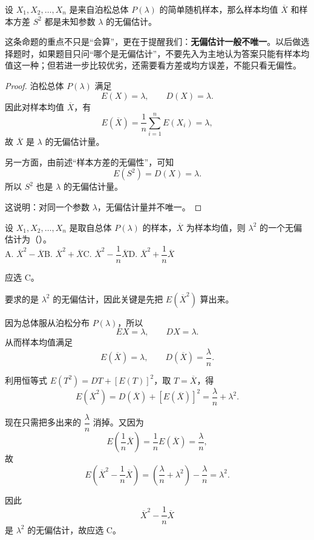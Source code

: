 ﻿\documentclass[lang=cn,11pt]{elegantbook}
\begin{document}
\begin{proposition}[泊松分布无偏估计的不唯一性]\label{prop:poisson-unbiased}
    设 $X_1, X_2, \dots, X_n$ 是来自泊松总体 $P(\lambda)$ 的简单随机样本，那么样本均值 $\overline{X}$ 和样本方差 $S^2$ 都是未知参数 $\lambda$ 的无偏估计。
\end{proposition}
\begin{note}
这条命题的重点不只是“会算”，更在于提醒我们：\textbf{无偏估计一般不唯一}。以后做选择题时，如果题目只问“哪个是无偏估计”，不要先入为主地认为答案只能有样本均值这一种；但若进一步比较优劣，还需要看方差或均方误差，不能只看无偏性。
\end{note}
\begin{proof}
泊松总体 \(P(\lambda)\) 满足
\[
E(X)=\lambda,\qquad D(X)=\lambda.
\]
因此对样本均值 \(\overline{X}\)，有
\[
E(\overline{X})=\frac{1}{n}\sum_{i=1}^n E(X_i)=\lambda,
\]
故 \(\overline{X}\) 是 \(\lambda\) 的无偏估计量。

另一方面，由前述“样本方差的无偏性”，可知
\[
E(S^2)=D(X)=\lambda.
\]
所以 \(S^2\) 也是 \(\lambda\) 的无偏估计量。

这说明：对同一个参数 \(\lambda\)，无偏估计量并不唯一。
\end{proof}

\begin{exercise}
    设 $X_1,X_2,\dots,X_n$ 是取自总体 $P(\lambda)$ 的样本，$\overline{X}$ 为样本均值，则 $\lambda^2$ 的一个无偏估计为（\quad）。\\
A. $\overline{X}^2 - \overline{X}$\qquad B. $\overline{X}^2 + \overline{X}$\qquad C. $\overline{X}^2 - \dfrac{1}{n}\overline{X}$\qquad D. $\overline{X}^2 + \dfrac{1}{n}\overline{X}$
\end{exercise}
\begin{solution}
应选 C。

要求的是 \(\lambda^2\) 的无偏估计，因此关键是先把 \(E(\overline{X}^2)\) 算出来。

因为总体服从泊松分布 \(P(\lambda)\)，所以
\[
EX=\lambda,\qquad DX=\lambda.
\]
从而样本均值满足
\[
E(\overline{X})=\lambda,\qquad D(\overline{X})=\frac{\lambda}{n}.
\]

利用恒等式 \(E(T^2)=DT+[E(T)]^2\)，取 \(T=\overline{X}\)，得
\[
E(\overline{X}^2)=D(\overline{X})+[E(\overline{X})]^2
=\frac{\lambda}{n}+\lambda^2.
\]

现在只需把多出来的 \(\dfrac{\lambda}{n}\) 消掉。又因为
\[
E\!\left(\frac{1}{n}\overline{X}\right)=\frac{1}{n}E(\overline{X})=\frac{\lambda}{n},
\]
故
\[
E\!\left(\overline{X}^2-\frac{1}{n}\overline{X}\right)
=\left(\frac{\lambda}{n}+\lambda^2\right)-\frac{\lambda}{n}
=\lambda^2.
\]

因此
\[
\overline{X}^2-\frac{1}{n}\overline{X}
\]
是 \(\lambda^2\) 的无偏估计，故应选 C。
\end{solution}
\end{document}
